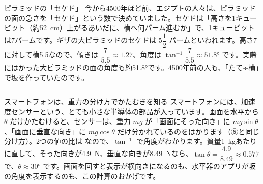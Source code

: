 \begin{kotoba}
\small
{}
\end{kotoba}

{}

\begin{column}{ピラミッドの「セケド」}
今から\num{4500}年ほど前、エジプトの人々は、ピラミッドの面の急さを「セケド」という数で決めていました。セケドは「高さを1キュービット（約\qty{52}{cm}）上がるあいだに、横へ何パーム進むか」で、1キュービットは7パームです。ギザの大ピラミッドのセケドは $5\dfrac{1}{2}$ パームといわれます。高さ7に対して横5.5なので、傾きは $\dfrac{7}{5.5}\approx1.27$、角度は $\tan^{-1}\dfrac{7}{5.5}\approx\ang{51.8}$ です。実際にはかった大ピラミッドの面の角度も約\ang{51.8}です。4500年前の人も、「たて÷横」で坂を作っていたのです。
\end{column}

\begin{column}{スマートフォンは、重力の分け方でかたむきを知る}
スマートフォンには、加速度センサーという、とても小さな半導体の部品が入っています。画面を水平から $\theta$ だけかたむけると、センサーは、重力 $mg$ が「画面にそった向き」に $mg\sin\theta$、「画面に垂直な向き」に $mg\cos\theta$ だけ分かれているのをはかります（⑥と同じ分け方）。2つの値の比は
なので、$\tan^{-1}$ で角度がわかります。質量\qty{1}{kg}あたりに直して、そった向きが\qty{4.9}{N}、垂直な向きが\qty{8.49}{N}なら、$\tan\theta=\dfrac{4.9}{8.49}\approx0.577$ で、$\theta\approx\ang{30}$ です。画面を回すと表示が横向きになるのも、水平器のアプリが坂の角度を表示するのも、この計算のおかげです。
\end{column}


